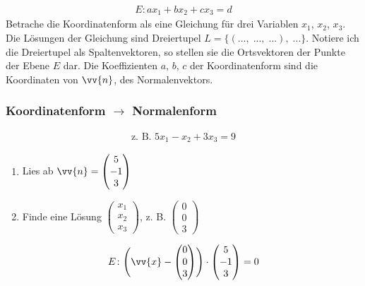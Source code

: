 \begin{gather*}
  E \colon ax_1 + bx_2 + cx_3 = d
\end{gather*}
Betrache die Koordinatenform als eine Gleichung für drei Variablen $x_1$, $x_2$, $x_3$. Die Lösungen der Gleichung sind Dreiertupel $L = \{(...,\;...,\;...),\;...\}$. Notiere ich die Dreiertupel als Spaltenvektoren, so stellen sie die Ortsvektoren der Punkte der Ebene $E$ dar. Die Koeffizienten $a$, $b$, $c$ der Koordinatenform sind die Koordinaten von $\vv{n}$, des Normalenvektors.
\subsubsection{Koordinatenform $\rightarrow$ Normalenform}
\begin{gather*}
  \text{z. B. } 5x_1 - x_2 + 3x_3 = 9
\end{gather*}
\begin{enumerate}
  \item Lies ab $\vv{n} = \begin{pmatrix}5 \\ -1 \\ 3\end{pmatrix}$
  \item Finde eine Lösung $\begin{pmatrix}x_1 \\ x_2 \\ x_3\end{pmatrix}$, z. B. $\begin{pmatrix}0 \\ 0 \\ 3\end{pmatrix}$
\end{enumerate}
\begin{gather*}
  E \colon \Biggl(\vv{x} - \begin{pmatrix}0 \\ 0 \\ 3\end{pmatrix}\Biggr) \cdot \begin{pmatrix}5 \\ -1 \\ 3\end{pmatrix} = 0
\end{gather*}

